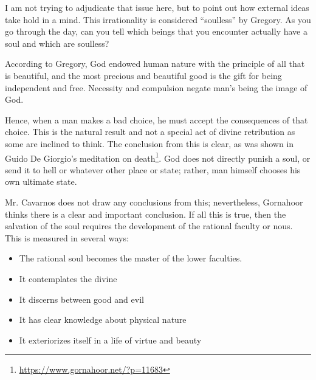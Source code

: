 I am not trying to adjudicate that issue here, but to point out how external ideas take hold in a mind. This irrationality is considered “soulless” by Gregory. As you go through the day, can you tell which beings that you encounter actually have a soul and which are soulless?

According to Gregory, God endowed human nature with the principle of all that is beautiful, and the most precious and beautiful good is the gift for being independent and free. Necessity and compulsion negate man's being the image of God.

Hence, when a man makes a bad choice, he must accept the consequences of that choice. This is the natural result and not a special act of divine retribution as some are inclined to think. The conclusion from this is clear, as was shown in Guido De Giorgio's meditation on death\footnote{\url{https://www.gornahoor.net/?p=11683}}. God does not directly punish a soul, or send it to hell or whatever other place or state; rather, man himself chooses his own ultimate state.

Mr. Cavarnos does not draw any conclusions from this; nevertheless, Gornahoor thinks there is a clear and important conclusion. If all this is true, then the salvation of the soul requires the development of the rational faculty or nous. This is measured in several ways:

\begin{itemize}
\item The rational soul becomes the master of the lower faculties. 
\item It contemplates the divine 
\item It discerns between good and evil 
\item It has clear knowledge about physical nature 
\item It exteriorizes itself in a life of virtue and beauty 
\end{itemize}

